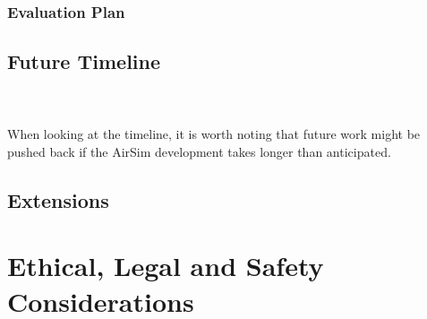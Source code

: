 \documentclass[12pt,oneside]{report}
\begin{document}
\subsection{Evaluation Plan}

\pagebreak
\section{Future Timeline} \label{timeline}

\\~\\
When looking at the timeline, it is worth noting that future work might be pushed back if the AirSim development takes longer than anticipated. 
\pagebreak
\section{Extensions}\label{Extensions}


\chapter{Ethical, Legal and Safety Considerations}



\newpage
\nocite{*}

\end{document}
